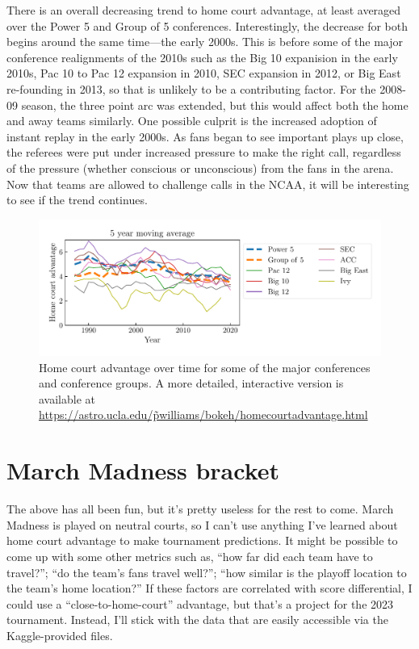 \documentclass[twocolumn]{aastex63}
\begin{document}
There is an overall decreasing trend to home court advantage, at least averaged over the Power 5 and Group of 5 conferences.
Interestingly, the decrease for both begins around the same time---the early 2000s.
This is before some of the major conference realignments of the 2010s such as the Big 10 expanision in the early 2010s, Pac 10 to Pac 12 expansion in 2010, SEC expansion in 2012, or Big East re-founding in 2013, so that is unlikely to be a contributing factor.
For the 2008-09 season, the three point arc was extended, but this would affect both the home and away teams similarly.
One possible culprit is the increased adoption of instant replay in the early 2000s.
As fans began to see important plays up close, the referees were put under increased pressure to make the right call, regardless of the pressure (whether conscious or unconscious) from the fans in the arena.
Now that teams are allowed to challenge calls in the NCAA, it will be interesting to see if the trend continues.

\begin{figure}
\centering
\includegraphics[width=6in]{figs/homecourtadvantage_vs_year.pdf}
\caption{Home court advantage over time for some of the major conferences and conference groups. A more detailed, interactive version is available at \href{https://astro.ucla.edu/\~pwilliams/bokeh/homecourtadvantage.html}{https://astro.ucla.edu/\~pwilliams/bokeh/homecourtadvantage.html}}
\label{fig:homecourtadvantage_vs_year}
\end{figure}

\section{March Madness bracket}
\label{sect:marchmadness}
The above has all been fun, but it's pretty useless for the rest to come.
March Madness is played on neutral courts, so I can't use anything I've learned about home court advantage to make tournament predictions.
It might be possible to come up with some other metrics such as, ``how far did each team have to travel?''; ``do the team's fans travel well?''; ``how similar is the playoff location to the team's home location?''
If these factors are correlated with score differential, I could use a ``close-to-home-court'' advantage, but that's a project for the 2023 tournament.
Instead, I'll stick with the data that are easily accessible via the Kaggle-provided files.
\end{document}
